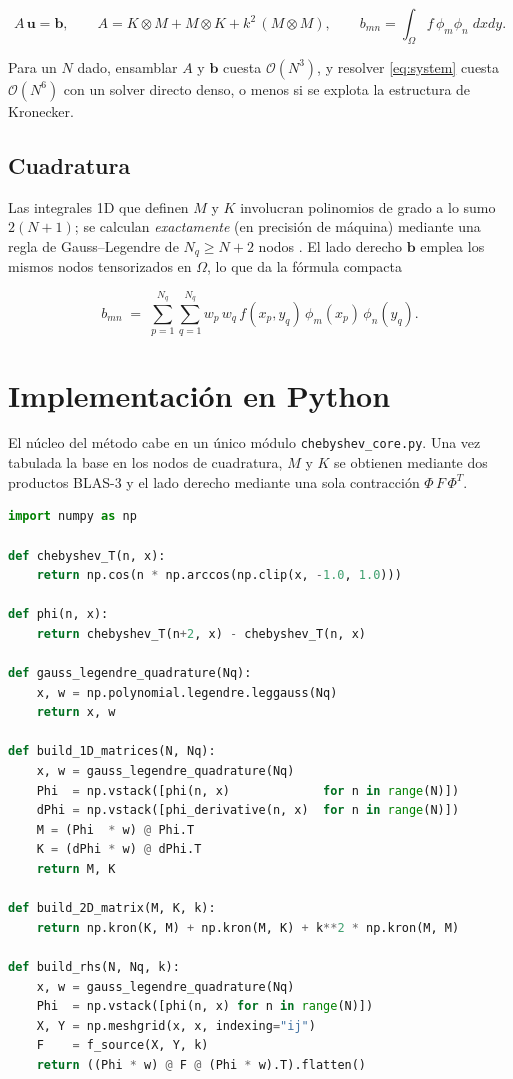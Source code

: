 \documentclass[11pt,a4paper,twoside,pdf]{article}
\numberwithin{equation}{section}
\begin{document}
\begin{equation}
\label{eq:system}
\boxed{
A\,\mathbf{u} = \mathbf{b},
\qquad
A = K \otimes M + M \otimes K + k^{2}\,(M \otimes M),
\qquad
b_{mn} = \int_{\Omega} f\,\phi_{m}\phi_{n} \; dxdy.
}
\end{equation}

Para un $N$ dado, ensamblar $A$ y $\mathbf{b}$ cuesta
$\mathcal{O}(N^{3})$, y resolver \eqref{eq:system} cuesta
$\mathcal{O}(N^{6})$ con un solver directo denso, o menos si se
explota la estructura de Kronecker.

\subsection{Cuadratura}

Las integrales 1D que definen $M$ y $K$ involucran polinomios de
grado a lo sumo $2(N+1)$; se calculan \emph{exactamente} (en
precisión de máquina) mediante una regla de Gauss--Legendre de
$N_{q} \ge N+2$ nodos \cite{canuto2006spectral}. El lado derecho
$\mathbf{b}$ emplea los mismos nodos tensorizados en $\Omega$, lo que
da la fórmula compacta

\[
b_{mn}
\;=\;
\sum_{p=1}^{N_{q}} \sum_{q=1}^{N_{q}}
w_{p}\,w_{q}\, f(x_{p},y_{q})\,\phi_{m}(x_{p})\,\phi_{n}(y_{q}).
\]

\section{Implementación en Python}
\label{sec:impl}

El núcleo del método cabe en un único módulo
\texttt{chebyshev\_core.py}. Una vez tabulada la base en los nodos de
cuadratura, $M$ y $K$ se obtienen mediante dos productos BLAS-3 y el
lado derecho mediante una sola contracción $\Phi\,F\,\Phi^{T}$.

\begin{lstlisting}[language=Python, caption={Rutinas principales de ensamblaje.}]
import numpy as np

def chebyshev_T(n, x):
    return np.cos(n * np.arccos(np.clip(x, -1.0, 1.0)))

def phi(n, x):
    return chebyshev_T(n+2, x) - chebyshev_T(n, x)

def gauss_legendre_quadrature(Nq):
    x, w = np.polynomial.legendre.leggauss(Nq)
    return x, w

def build_1D_matrices(N, Nq):
    x, w = gauss_legendre_quadrature(Nq)
    Phi  = np.vstack([phi(n, x)             for n in range(N)])
    dPhi = np.vstack([phi_derivative(n, x)  for n in range(N)])
    M = (Phi  * w) @ Phi.T
    K = (dPhi * w) @ dPhi.T
    return M, K

def build_2D_matrix(M, K, k):
    return np.kron(K, M) + np.kron(M, K) + k**2 * np.kron(M, M)

def build_rhs(N, Nq, k):
    x, w = gauss_legendre_quadrature(Nq)
    Phi  = np.vstack([phi(n, x) for n in range(N)])
    X, Y = np.meshgrid(x, x, indexing="ij")
    F    = f_source(X, Y, k)
    return ((Phi * w) @ F @ (Phi * w).T).flatten()
\end{lstlisting}
\end{document}
